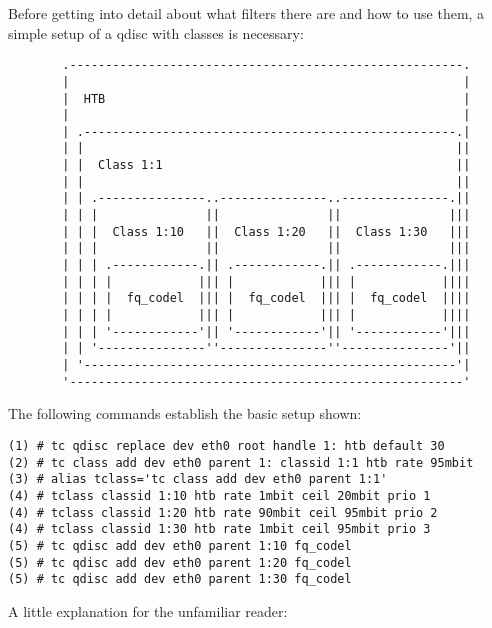 \documentclass[12pt,twoside]{article}
\begin{document}
Before getting into detail about what filters there are and how to use them, a
simple setup of a qdisc with classes is necessary:
\begin{figure}[H]
\begin{Verbatim}
  .-------------------------------------------------------.
  |                                                       |
  |  HTB                                                  |
  |                                                       |
  | .----------------------------------------------------.|
  | |                                                    ||
  | |  Class 1:1                                         ||
  | |                                                    ||
  | | .---------------..---------------..---------------.||
  | | |               ||               ||               |||
  | | |  Class 1:10   ||  Class 1:20   ||  Class 1:30   |||
  | | |               ||               ||               |||
  | | | .------------.|| .------------.|| .------------.|||
  | | | |            ||| |            ||| |            ||||
  | | | |  fq_codel  ||| |  fq_codel  ||| |  fq_codel  ||||
  | | | |            ||| |            ||| |            ||||
  | | | '------------'|| '------------'|| '------------'|||
  | | '---------------''---------------''---------------'||
  | '----------------------------------------------------'|
  '-------------------------------------------------------'
\end{Verbatim}
\end{figure}
\noindent
The following commands establish the basic setup shown:
\begin{Verbatim}
(1) # tc qdisc replace dev eth0 root handle 1: htb default 30
(2) # tc class add dev eth0 parent 1: classid 1:1 htb rate 95mbit
(3) # alias tclass='tc class add dev eth0 parent 1:1'
(4) # tclass classid 1:10 htb rate 1mbit ceil 20mbit prio 1
(4) # tclass classid 1:20 htb rate 90mbit ceil 95mbit prio 2
(4) # tclass classid 1:30 htb rate 1mbit ceil 95mbit prio 3
(5) # tc qdisc add dev eth0 parent 1:10 fq_codel
(5) # tc qdisc add dev eth0 parent 1:20 fq_codel
(5) # tc qdisc add dev eth0 parent 1:30 fq_codel
\end{Verbatim}
A little explanation for the unfamiliar reader:
\end{document}
